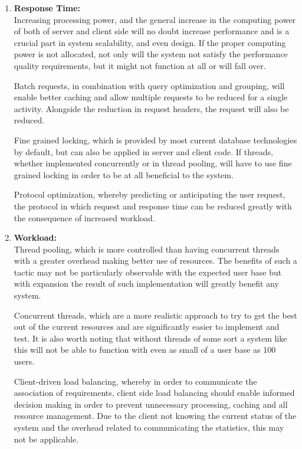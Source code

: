 \documentclass{article}
\begin{document}
			\begin{enumerate}

				\item{\bfseries Response Time:}\\

				Increasing processing power, and the general increase in the computing power of both of server and client side will no doubt increase performance and is a crucial part in system scalability, and even design. If the proper computing power is not allocated, not only will the system not satisfy the performance quality requirements, but it might not function at all or will fall over.

				Batch requests, in combination with query optimization and grouping, will enable better caching and allow multiple requests to be reduced for a single activity. Alongside the reduction in request headers, the request will also be reduced.

				Fine grained locking, which is provided by most current database technologies by default, but can also be applied in server and client code. If threads, whether implemented concurrently or in thread pooling, will have to use fine grained locking in order to be at all beneficial to the system.

				Protocol optimization, whereby predicting or anticipating the user request, the protocol in which request and response time can be reduced greatly with the consequence of increased workload.

				\item{\bfseries Workload:}\\

				Thread pooling, which is more controlled than having concurrent threads with a greater overhead making better use of resources. The benefits of such a tactic may not be particularly observable with the expected user base but with expansion the result of such implementation will greatly benefit any system.

				Concurrent threads, which are a more realistic approach to try to get the best out of the current resources and are significantly easier to implement and test. It is also worth noting that without threads of some sort a system like this will not be able to function with even as small of a user base as 100 users.

				Client-driven load balancing, whereby in order to communicate the association of requirements, client side load balancing should enable informed decision making in order to prevent unnecessary processing, caching and all resource management. Due to the client not knowing the current status of the system and the overhead related to communicating the statistics, this may not be applicable.


\end{enumerate}
\end{document}
